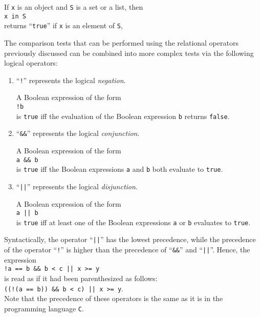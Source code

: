If \texttt{x} is an object and \texttt{S} is a set or a list, then
\\[0.2cm]
\hspace*{1.3cm}
\texttt{x in S}
\\[0.2cm]
returns ``\texttt{true}'' if \texttt{x} is an element of \texttt{S},

The comparison tests that can be performed using the relational operators previously discussed can be combined into more
complex tests via the following logical operators:
\begin{enumerate}
\item ``\texttt{!}''  represents the logical \emph{negation}.

      A Boolean expression of the form
      \\[0.2cm]
      \hspace*{1.3cm}
      \texttt{!b}
      \\[0.2cm]
      is \texttt{true} iff the evaluation of the Boolean expression \texttt{b} returns \texttt{false}.
\item ``\texttt{\&\&}'' represents the logical \emph{conjunction}.

      A Boolean expression of the form
      \\[0.2cm]
      \hspace*{1.3cm}
      \texttt{a \&\& b}
      \\[0.2cm]
      is \texttt{true} iff the Boolean expressions \texttt{a} and \texttt{b} both evaluate to \texttt{true}.
\item ``\texttt{||}''  represents the logical \emph{disjunction}.

      A Boolean expression of the form
      \\[0.2cm]
      \hspace*{1.3cm}
      \texttt{a || b}
      \\[0.2cm]
      is \texttt{true} iff at least one of the Boolean expressions \texttt{a} or \texttt{b} evaluates to \texttt{true}.
\end{enumerate}
Syntactically, the operator ``\texttt{||}'' has the lowest precedence, while the precedence of the operator ``\texttt{!}''
is higher than the precedence of ``\texttt{\&\&}'' and ``\texttt{||}''.  Hence, the expression 
\\[0.2cm]
\hspace*{1.3cm}
\texttt{!a == b \&\& b < c || x >= y}
\\[0.2cm]
is read as if it had been parenthesized as follows:
\\[0.2cm]
\hspace*{1.3cm}
\texttt{((!(a == b)) \&\& b < c) || x >= y}.
\\[0.2cm]
Note that the precedence of these operators is the same as it is in the programming language \texttt{C}.

